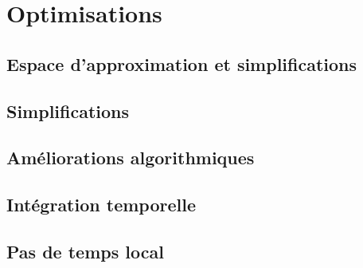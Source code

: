 \documentclass[
	10pt,
]{beamer}
\begin{document}




\section{Optimisations}

\subsection{Espace d'approximation et simplifications}


\subsection*{Simplifications}



\subsection{Améliorations algorithmiques}

\subsection*{Intégration temporelle}




\subsection*{Pas de temps local}
\end{document}
